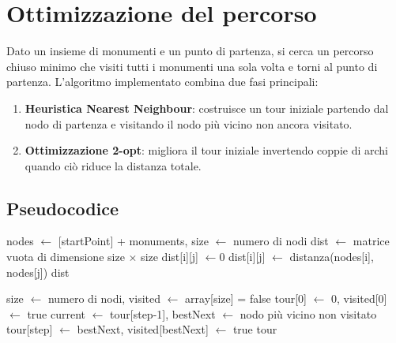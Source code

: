 \section{Ottimizzazione del percorso}
\vspace{-5pt} %
Dato un insieme di monumenti e un punto di partenza, si cerca un percorso chiuso minimo che visiti tutti i monumenti una sola volta e torni al punto di partenza.
L'algoritmo implementato combina due fasi principali:
\vspace{-5pt}
\begin{enumerate}
    \setlength{\itemsep}{0pt} %
    \setlength{\parskip}{0pt}
    \item \textbf{Heuristica Nearest Neighbour}: costruisce un tour iniziale partendo dal nodo di partenza e visitando il nodo più vicino non ancora visitato.
    \item \textbf{Ottimizzazione 2-opt}: migliora il tour iniziale invertendo coppie di archi quando ciò riduce la distanza totale.
\end{enumerate}

\vspace{-10pt}
\subsection*{Pseudocodice}
\vspace{-5pt}

\begin{algorithm}[H]
\caption{Costruzione matrice delle distanze}
\begin{algorithmic}[1]
    \State nodes $\gets$ [startPoint] + monuments, size $\gets$ numero di nodi
    \State dist $\gets$ matrice vuota di dimensione size $\times$ size
             \State dist[i][j] $\gets 0$
            \Else \State dist[i][j] $\gets$ distanza(nodes[i], nodes[j])
            \EndIf
        \EndFor
    \EndFor
    \State \Return dist
\EndFunction
\end{algorithmic}
\end{algorithm}

\vspace{-15pt} %

\begin{algorithm}[H]
\caption{Nearest Neighbour}
\begin{algorithmic}[1]
    \State size $\gets$ numero di nodi, visited $\gets$ array[size] = false
    \State tour[0] $\gets$ 0, visited[0] $\gets$ true
        \State current $\gets$ tour[step-1], bestNext $\gets$ nodo più vicino non visitato
        \State tour[step] $\gets$ bestNext, visited[bestNext] $\gets$ true
    \EndFor
    \State \Return tour
\EndFunction
\end{algorithmic}
\end{algorithm}


